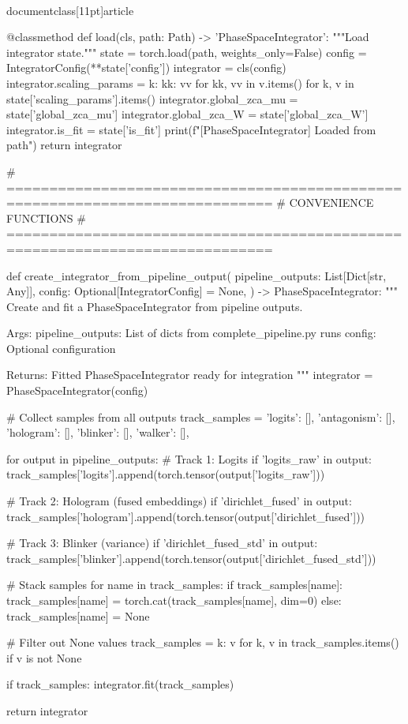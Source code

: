 \\documentclass[11pt]{article}
\begin{document}
\begin{CodeBlock}
    @classmethod
    def load(cls, path: Path) -> 'PhaseSpaceIntegrator':
        """Load integrator state."""
        state = torch.load(path, weights_only=False)
        config = IntegratorConfig(**state['config'])
        integrator = cls(config)
        integrator.scaling_params = {
            k: {kk: vv for kk, vv in v.items()}
            for k, v in state['scaling_params'].items()
        }
        integrator.global_zca_mu = state['global_zca_mu']
        integrator.global_zca_W = state['global_zca_W']
        integrator.is_fit = state['is_fit']
        print(f"[PhaseSpaceIntegrator] Loaded from {path}")
        return integrator


# =============================================================================
# CONVENIENCE FUNCTIONS
# =============================================================================

def create_integrator_from_pipeline_output(
    pipeline_outputs: List[Dict[str, Any]],
    config: Optional[IntegratorConfig] = None,
) -> PhaseSpaceIntegrator:
    """
    Create and fit a PhaseSpaceIntegrator from pipeline outputs.

    Args:
        pipeline_outputs: List of dicts from complete_pipeline.py runs
        config: Optional configuration

    Returns:
        Fitted PhaseSpaceIntegrator ready for integration
    """
    integrator = PhaseSpaceIntegrator(config)

    # Collect samples from all outputs
    track_samples = {
        'logits': [],
        'antagonism': [],
        'hologram': [],
        'blinker': [],
        'walker': [],
    }

    for output in pipeline_outputs:
        # Track 1: Logits
        if 'logits_raw' in output:
            track_samples['logits'].append(torch.tensor(output['logits_raw']))

        # Track 2: Hologram (fused embeddings)
        if 'dirichlet_fused' in output:
            track_samples['hologram'].append(torch.tensor(output['dirichlet_fused']))

        # Track 3: Blinker (variance)
        if 'dirichlet_fused_std' in output:
            track_samples['blinker'].append(torch.tensor(output['dirichlet_fused_std']))

    # Stack samples
    for name in track_samples:
        if track_samples[name]:
            track_samples[name] = torch.cat(track_samples[name], dim=0)
        else:
            track_samples[name] = None

    # Filter out None values
    track_samples = {k: v for k, v in track_samples.items() if v is not None}

    if track_samples:
        integrator.fit(track_samples)

    return integrator

\end{CodeBlock}
\end{document}

